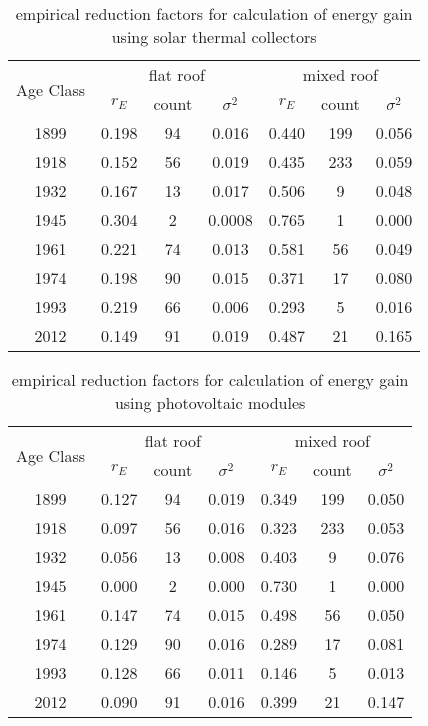 \begin{table}
\centering 

\begin{tabular}{|c||c|c|c||c|c|c|}
  \hline
  \multirow{2}{*}{Age Class} & \multicolumn{3}{|c||}{flat roof} &  \multicolumn{3}{|c|}{mixed roof}\\
  \cline{2-7}
  & $r_E$ & count & $\sigma^2$  & $r_E$ & count & $\sigma^2$\\
  \hline
1899&0.198&94&0.016&0.440&199&0.056\\\hline
1918&0.152&56&0.019&0.435&233&0.059\\\hline
1932&0.167&13&0.017&0.506&9&0.048\\\hline
1945&0.304&2&0.0008&0.765&1&0.000\\\hline
1961&0.221&74&0.013&0.581&56&0.049\\\hline
1974&0.198&90&0.015&0.371&17&0.080\\\hline
1993&0.219&66&0.006&0.293&5&0.016\\\hline
2012&0.149&91&0.019&0.487&21&0.165\\\hline
\end{tabular}
\caption{empirical reduction factors for calculation of energy gain using solar thermal collectors }
 \label{tab:roofarea_st}
\end{table}

\begin{table}
\centering 
\begin{tabular}{|c||c|c|c||c|c|c|}
  \hline
  \multirow{2}{*}{Age Class} & \multicolumn{3}{|c||}{flat roof} &  \multicolumn{3}{|c|}{mixed roof}\\
  \cline{2-7}
  & $r_E$ & count & $\sigma^2$  & $r_E$ & count & $\sigma^2$\\
  \hline
1899&0.127&94&0.019&0.349&199&0.050\\\hline
1918&0.097&56&0.016&0.323&233&0.053\\\hline
1932&0.056&13&0.008&0.403&9&0.076\\\hline
1945&0.000&2&0.000&0.730&1&0.000\\\hline
1961&0.147&74&0.015&0.498&56&0.050\\\hline
1974&0.129&90&0.016&0.289&17&0.081\\\hline
1993&0.128&66&0.011&0.146&5&0.013\\\hline
2012&0.090&91&0.016&0.399&21&0.147\\\hline
\end{tabular}
\caption{empirical reduction factors for calculation of energy gain using photovoltaic modules }
 \label{tab:roofarea_pv}
\end{table}

